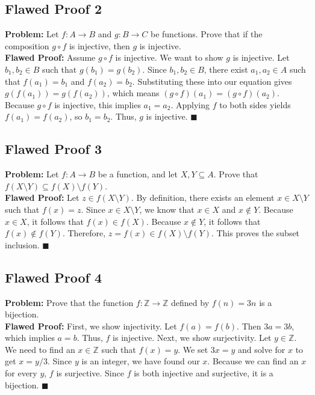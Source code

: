 \documentclass[11pt, a4paper]{article}
\theoremstyle{definition}
\theoremstyle{remark}
\newcommand{\Z}{\mathbb{Z}}
\begin{document}
\subsection{Flawed Proof 2}
\textbf{Problem:} Let $f: A \to B$ and $g: B \to C$ be functions. Prove that if the composition $g \circ f$ is injective, then $g$ is injective. \\
\textbf{Flawed Proof:} Assume $g \circ f$ is injective. We want to show $g$ is injective. Let $b_1, b_2 \in B$ such that $g(b_1) = g(b_2)$. Since $b_1, b_2 \in B$, there exist $a_1, a_2 \in A$ such that $f(a_1) = b_1$ and $f(a_2) = b_2$. Substituting these into our equation gives $g(f(a_1)) = g(f(a_2))$, which means $(g \circ f)(a_1) = (g \circ f)(a_2)$. Because $g \circ f$ is injective, this implies $a_1 = a_2$. Applying $f$ to both sides yields $f(a_1) = f(a_2)$, so $b_1 = b_2$. Thus, $g$ is injective. $\blacksquare$

\subsection{Flawed Proof 3}
\textbf{Problem:} Let $f: A \to B$ be a function, and let $X, Y \subseteq A$. Prove that $f(X \setminus Y) \subseteq f(X) \setminus f(Y)$. \\
\textbf{Flawed Proof:} Let $z \in f(X \setminus Y)$. By definition, there exists an element $x \in X \setminus Y$ such that $f(x) = z$. Since $x \in X \setminus Y$, we know that $x \in X$ and $x \notin Y$. Because $x \in X$, it follows that $f(x) \in f(X)$. Because $x \notin Y$, it follows that $f(x) \notin f(Y)$. Therefore, $z = f(x) \in f(X) \setminus f(Y)$. This proves the subset inclusion. $\blacksquare$

\subsection{Flawed Proof 4}
\textbf{Problem:} Prove that the function $f: \Z \to \Z$ defined by $f(n) = 3n$ is a bijection. \\
\textbf{Flawed Proof:} First, we show injectivity. Let $f(a) = f(b)$. Then $3a = 3b$, which implies $a = b$. Thus, $f$ is injective. Next, we show surjectivity. Let $y \in \Z$. We need to find an $x \in \Z$ such that $f(x) = y$. We set $3x = y$ and solve for $x$ to get $x = y/3$. Since $y$ is an integer, we have found our $x$. Because we can find an $x$ for every $y$, $f$ is surjective. Since $f$ is both injective and surjective, it is a bijection. $\blacksquare$
\end{document}
